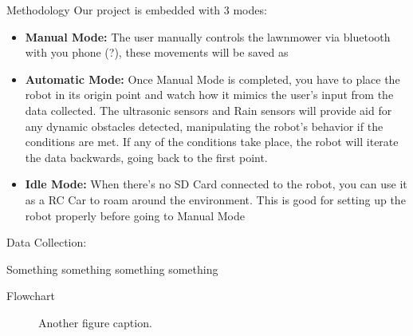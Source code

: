 \documentclass[final]{beamer}
\newlength{\colwidth}
\begin{document}
\begin{frame}[t]
\begin{columns}[t]
\begin{column}{\colwidth}
\begin{block}{Methodology}
    Our project is embedded with 3 modes:
    \begin{itemize}
        \item \textbf{Manual Mode:}
        The user manually controls the lawnmower via bluetooth with you phone (?), these movements will be saved as 
        \item \textbf{Automatic Mode:}
        Once Manual Mode is completed, you have to place the robot in its origin point and watch how it mimics the user's input from the data collected. The ultrasonic sensors and Rain sensors will provide aid for any dynamic obstacles detected, manipulating the robot's behavior if the conditions are met. If any of the conditions take place, the robot will iterate the data backwards, going back to the first point.  
        \item \textbf{Idle Mode:}
        When there's no SD Card connected to the robot, you can use it as a RC Car to roam around the environment. This is good for setting up the robot properly before going to Manual Mode
        
    \end{itemize}

  \end{block}

  \begin{heading}{Data Collection:}

    Something something something something
  \end{heading}
  \begin{block}{Flowchart}
    \begin{figure}
      \centering
      \caption{Another figure caption.}
    \end{figure}
  \end{block}
  


\end{column}
\end{columns}
\end{frame}
\end{document}
